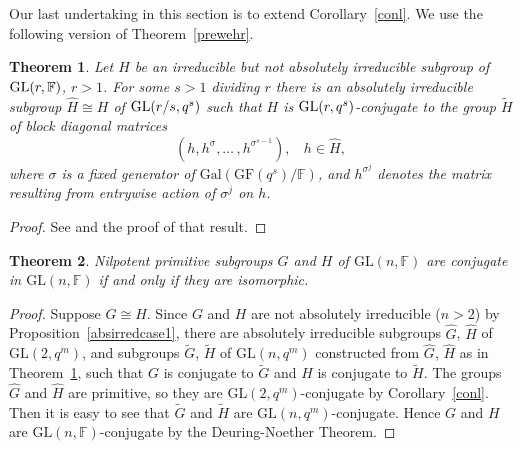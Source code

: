 \documentclass[12pt]{amsart}
\newtheorem{theorem}{Theorem}[section]
\theoremstyle{definition}
\theoremstyle{remark}
\newtheorem*{remark}{Remark}
\renewcommand{\hat}{\widehat}
\renewcommand{\tilde}{\widetilde}
\begin{document}
 Our last undertaking in this section is to extend 
 Corollary~\ref{conl}.
 We use the following version 
 of Theorem~\ref{prewehr}.
\begin{theorem}
\label{explwehr}
 Let $H$ be an irreducible but not absolutely 
 irreducible subgroup of ${\rm GL}(r,\mathbb{F})$, $r>1$. 
 For some $s>1$ dividing $r$ there is an 
 absolutely irreducible subgroup $\hat{H}\cong H$ of
 ${\rm GL}(r/s,q^s)$ such that $H$ is
 ${\rm GL}(r, q^s)$-conjugate to the 
 group $\tilde{H}$ of block diagonal matrices
$$
(h, h^{\sigma}, \ldots \, \! , 
h^{\sigma^{s-1}}) , \ \ \ \ h \in \hat{H} , 
$$
 where $\sigma$ is 
 a fixed generator 
 of $\mathrm{Gal}(\mathrm{GF}(q^s)/\mathbb{F})$, 
 and $h^{\sigma^j}$ denotes the matrix resulting from 
 entrywise action of $\sigma^j$ on $h$. 
\end{theorem}
\begin{proof}
 See \cite[9.21, p.154]{Isaacs} and the proof of that 
 result.
\end{proof}
\begin{theorem}
\label{iecagain}
 Nilpotent primitive subgroups $G$ and $H$ of 
 $\mathrm{GL}(n,\mathbb{F})$ 
 are conjugate in  $\mathrm{GL}(n,\mathbb{F})$
 if and only if they are isomorphic.
 \end{theorem}
\begin{proof}
 Suppose $G \cong H$.
 Since $G$ and $H$ are not
 absolutely irreducible ($n>2$) by Proposition~\ref{absirredcase1},
 there are absolutely irreducible 
 subgroups $\hat{G}$, $\hat{H}$ of $\mathrm{GL}(2,q^m)$, and 
 subgroups $\tilde{G}$, $\tilde{H}$ of $\mathrm{GL}(n,q^m)$
 constructed from  $\hat{G}$, $\hat{H}$ as in 
 Theorem~\ref{explwehr}, such that $G$ is conjugate to 
 $\tilde{G}$ and $H$ is conjugate to 
 $\tilde{H}$. The groups $\hat{G}$ and $\hat{H}$ are primitive, 
 so they are $\mathrm{GL}(2,q^m)$-conjugate by Corollary~\ref{conl}.
 Then it is easy to see that $\tilde{G}$ and $\tilde{H}$
 are $\mathrm{GL}(n,q^m)$-conjugate. 
 Hence $G$ and $H$ are $\mathrm{GL}(n,\mathbb{F})$-conjugate 
 by the Deuring-Noether Theorem.
\end{proof}
\end{document}
